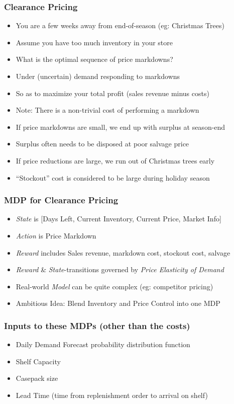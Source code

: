 \documentclass[handout]{beamer}
\begin{document}
\begin{frame}
\frametitle{Clearance Pricing}
\pause
\begin{itemize}[<+->]
\item You are a few weeks away from end-of-season (eg: Christmas Trees)
\item Assume you have too much inventory in your store
\item What is the optimal sequence of price markdowns?
\item Under (uncertain) demand responding to markdowns
\item So as to maximize your total profit (sales revenue minus costs)
\item Note: There is a non-trivial cost of performing a markdown
\item If price markdowns are small, we end up with surplus at season-end
\item Surplus often needs to be disposed at poor salvage price
\item If price reductions are large, we run out of Christmas trees early
\item ``Stockout'' cost is considered to be large during holiday season
\end{itemize}
\end{frame}

\begin{frame}
\frametitle{MDP for Clearance Pricing}
\pause
\begin{itemize}
\item {\em State} is [Days Left, Current Inventory, Current Price, Market Info]
\item {\em Action} is Price Markdown
\item {\em Reward} includes Sales revenue, markdown cost, stockout cost, salvage
\item {\em Reward} \& {\em State}-transitions governed by {\em Price Elasticity of Demand}
\item Real-world {\em Model} can be quite complex (eg: competitor pricing)
\item Ambitious Idea: Blend Inventory and Price Control into one MDP
\end{itemize}
\end{frame}


\begin{frame}
\frametitle{Inputs to these MDPs (other than the costs)}
\pause
\begin{itemize}[<+->]
\item Daily Demand Forecast probability distribution function
\item Shelf Capacity
\item Casepack size
\item Lead Time (time from replenishment order to arrival on shelf)
\end{itemize}
\end{frame}
\end{document}
